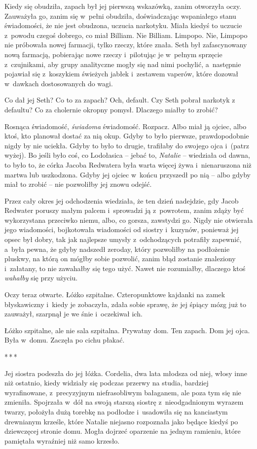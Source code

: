 \documentclass[oneside,polish,11pt,sfheadings]{mwbk}
\newcommand{\threeast}{\bigskip\par\centerline{*\,*\,*}\medskip\par}
\begin{document}
Kiedy się obudziła, zapach był jej pierwszą wskazówką, zanim otworzyła
oczy. Zauważyła go, zanim się w~pełni obudziła, doświadczając
wspaniałego stanu świadomości, że nie jest obudzona, uczucia narkotyku.
Miała kiedyś to uczucie z~powodu czegoś dobrego, co miał Billiam. Nie
Billiam. Limpopo. Nie, Limpopo nie próbowała nowej farmacji, tylko
rzeczy, które znała. Seth był zafascynowany nową farmacją, pobierając
nowe rzeczy i~pilotując je w~pełnym sprzęcie z~czujnikami, aby grupy
analityczne mogły się nad nimi pochylić, a~następnie pojawiał się z~koszykiem świeżych jabłek i~zestawem vaperów, które dozował w~dawkach
dostosowanych do wagi.

Co dał jej Seth? Co to za zapach? Och, default. Czy Seth pobrał narkotyk
z defaultu? Co za cholernie okropny pomysł. Dlaczego miałby to zrobić?

Rosnąca świadomość, \textit{świadoma} świadomość. Rozpacz. Albo miał ją
ojciec, albo ktoś, kto planował dostać za nią okup. Gdyby to było
pierwsze, prawdopodobnie nigdy by nie uciekła. Gdyby to było to drugie,
trafiłaby do swojego ojca i~(patrz wyżej). Bo jeśli było coś, co
Lodołasica -- jebać to, \textit{Natalie} -- wiedziała od dawna, to było to,
że córka Jacoba Redwatera była warta więcej żywa i~nienaruszona niż
martwa lub uszkodzona. Gdyby jej ojciec w~końcu przyszedł po nią -- albo
gdyby miał to zrobić -- nie pozwoliłby jej znowu odejść.

Przez cały okres jej odchodzenia wiedziała, że ten dzień nadejdzie, gdy
Jacob Redwater poruszy małym palcem i~sprowadzi ją z~powrotem, zanim
zdąży być wykorzystana przeciwko niemu, albo, co gorsza, zawstydzi go.
Nigdy nie otwierała jego wiadomości, bojkotowała wiadomości od siostry i~kuzynów, ponieważ jej opsec był dobry, tak jak najlepsze umysły z~odchodzących potrafiły zapewnić, a~była pewna, że gdyby nadszedł
zeroday, który pozwoliłby na podłożenie pluskwy, na którą on mógłby
sobie pozwolić, zanim błąd zostanie znaleziony i~załatany, to nie
zawahałby się tego użyć. Nawet nie rozumiałby, dlaczego ktoś
\textit{wahałby} się przy użyciu.

Oczy teraz otwarte. Łóżko szpitalne. Czteropunktowe kajdanki na zamek
błyskawiczny i~kiedy je zobaczyła, zdała sobie sprawę, że jej śpiący
mózg już to zauważył, szarpnął je we śnie i~oczekiwał ich.

Łóżko szpitalne, ale nie sala szpitalna. Prywatny dom. Ten zapach. Dom
jej ojca. Była w~domu. Zaczęła po cichu płakać.

\threeast

Jej siostra podeszła do jej łóżka. Cordelia, dwa lata młodsza od niej,
włosy inne niż ostatnio, kiedy widziały się podczas przerwy na studia,
bardziej wyrafinowane, z~precyzyjnym niefrasobliwym bałaganem, ale poza
tym się nie zmieniła. Spojrzała w~dół na swoją starszą siostrę z~nieodgadnionym wyrazem twarzy, położyła dużą torebkę na podłodze i~usadowiła się na kanciastym drewnianym krześle, które Natalie niejasno
rozpoznała jako będące kiedyś po dziewczęcej stronie domu. Mogła dojrzeć
oparzenie na jednym ramieniu, które pamiętała wyraźniej niż samo
krzesło.
\end{document}
